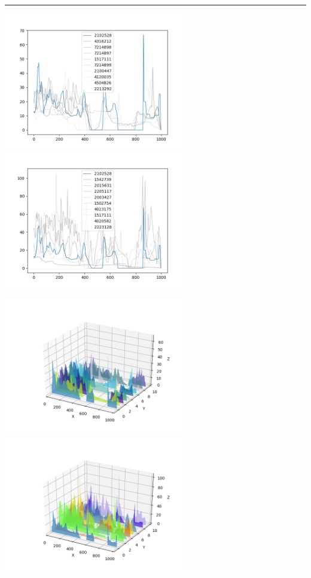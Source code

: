 \documentclass{article}
\begin{document}
\begin{center}
\noindent\rule{\textwidth}{1pt}

\includegraphics[height=6cm, width=8cm]{6.png}\includegraphics[height=6cm, width=8cm]{6_cos.png}

\includegraphics[height=6cm, width=8cm]{6_3d.png} \includegraphics[height=6cm, width=8cm]{6_cos_3d.png}


\end{center}
\end{document}
